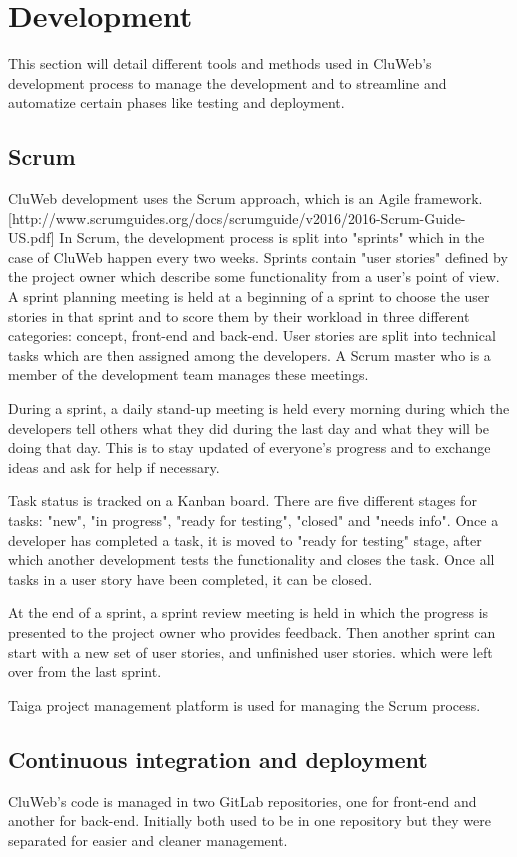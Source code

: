 \section{Development}
This section will detail different tools and methods used in CluWeb's development process to manage the development and to streamline and automatize certain phases like testing and deployment.

\subsection{Scrum}
CluWeb development uses the Scrum approach, which is an Agile framework. [http://www.scrumguides.org/docs/scrumguide/v2016/2016-Scrum-Guide-US.pdf]
In Scrum, the development process is split into "sprints" which in the case of CluWeb happen every two weeks. Sprints contain "user stories" defined by the project owner which describe some functionality from a user's point of view. A sprint planning meeting is held at a beginning of a sprint to choose the user stories in that sprint and to score them by their workload in three different categories: concept, front-end and back-end. User stories are split into technical tasks which are then assigned among the developers. A Scrum master who is a member of the development team manages these meetings.

During a sprint, a daily stand-up meeting is held every morning during which the developers tell others what they did during the last day and what they will be doing that day. This is to stay updated of everyone's progress and to exchange ideas and ask for help if necessary.

Task status is tracked on a Kanban board. There are five different stages for tasks: "new", "in progress", "ready for testing", "closed" and "needs info". Once a developer has completed a task, it is moved to "ready for testing" stage, after which another development tests the functionality and closes the task. Once all tasks in a user story have been completed, it can be closed.

At the end of a sprint, a sprint review meeting is held in which the progress is presented to the project owner who provides feedback. Then another sprint can start with a new set of user stories, and unfinished user stories. which were left over from the last sprint.

Taiga project management platform is used for managing the Scrum process.

\subsection{Continuous integration and deployment}
CluWeb's code is managed in two GitLab repositories, one for front-end and another for back-end. Initially both used to be in one repository but they were separated for easier and cleaner management.

